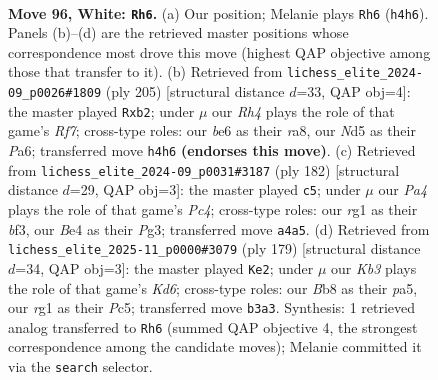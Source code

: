 \documentclass[11pt]{article}
\begin{document}
\clearpage

\begin{figure}[p]\centering
\begin{subfigure}{0.46\textwidth}\centering
\resizebox{\linewidth}{!}{%
\newchessgame
\chessboard[
  setfen={1B3k2/8/1P2b3/3N4/P3B2R/1K5p/8/6r1 w - - 13 96},
  showmover=false,
  pgfstyle=straightmove, color=movearrow, markmove={h4-h6}
]}
\caption{}
\end{subfigure}\hfill
\begin{subfigure}{0.46\textwidth}\centering
\resizebox{\linewidth}{!}{%
\newchessgame
\chessboard[
  setfen={R7/8/p5K1/1b1kb3/p7/2P5/1P3r2/8 b - - 13 103},
  showmover=false,
  pgfstyle=straightmove, color=movearrow, markmove={f2-b2}
]}
\caption{}
\end{subfigure}
\\[4pt]
\begin{subfigure}{0.46\textwidth}\centering
\resizebox{\linewidth}{!}{%
\newchessgame
\chessboard[
  setfen={5k2/2R5/4r3/7p/2P4B/3K1bP1/8/8 w - - 73 92},
  showmover=false,
  pgfstyle=straightmove, color=movearrow, markmove={c4-c5}
]}
\caption{}
\end{subfigure}\hfill
\begin{subfigure}{0.46\textwidth}\centering
\resizebox{\linewidth}{!}{%
\newchessgame
\chessboard[
  setfen={8/2K5/p6R/Pbp5/8/n2k4/8/4B3 b - - 58 90},
  showmover=false,
  pgfstyle=straightmove, color=movearrow, markmove={d3-e2}
]}
\caption{}
\end{subfigure}
\caption{\textbf{Move 96, White: \texttt{Rh6}.} (a) Our position; Melanie plays \texttt{Rh6} (\texttt{h4h6}). Panels (b)--(d) are the retrieved master positions whose correspondence most drove this move (highest QAP objective among those that transfer to it). (b) Retrieved from \texttt{lichess\_elite\_2024-09\_p0026\#1809} (ply 205) [structural distance $d$=33, QAP obj=4]: the master played \texttt{Rxb2}; under $\mu$ our \emph{Rh4} plays the role of that game's \emph{Rf7}; cross-type roles: our \emph{b}e6 as their \emph{r}a8, our \emph{N}d5 as their \emph{P}a6; transferred move \texttt{h4h6} \textbf{(endorses this move)}. (c) Retrieved from \texttt{lichess\_elite\_2024-09\_p0031\#3187} (ply 182) [structural distance $d$=29, QAP obj=3]: the master played \texttt{c5}; under $\mu$ our \emph{Pa4} plays the role of that game's \emph{Pc4}; cross-type roles: our \emph{r}g1 as their \emph{b}f3, our \emph{B}e4 as their \emph{P}g3; transferred move \texttt{a4a5}. (d) Retrieved from \texttt{lichess\_elite\_2025-11\_p0000\#3079} (ply 179) [structural distance $d$=34, QAP obj=3]: the master played \texttt{Ke2}; under $\mu$ our \emph{Kb3} plays the role of that game's \emph{Kd6}; cross-type roles: our \emph{B}b8 as their \emph{p}a5, our \emph{r}g1 as their \emph{P}c5; transferred move \texttt{b3a3}. Synthesis: 1 retrieved analog transferred to \texttt{Rh6} (summed QAP objective 4, the strongest correspondence among the candidate moves); Melanie committed it via the \texttt{search} selector.}
\label{fig:thought-m190}
\end{figure}
\end{document}
